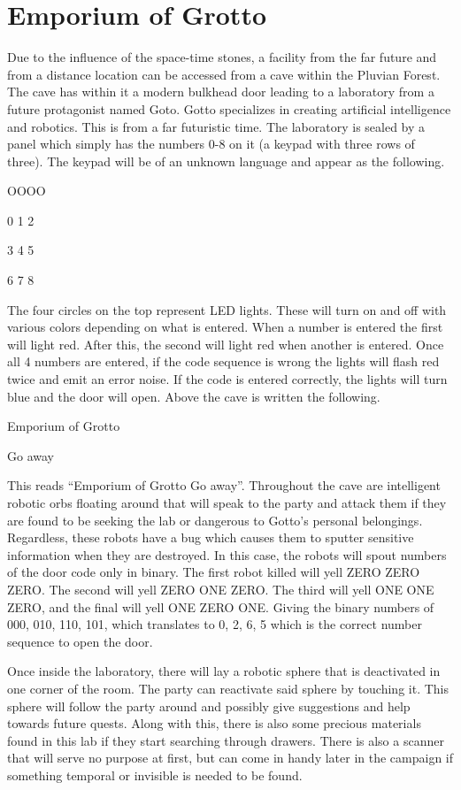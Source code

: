 \section{Emporium of Grotto}

Due to the influence of the space-time stones, a facility from the far future and from a distance location can be accessed from a cave within the Pluvian Forest. The cave has within it a modern bulkhead door leading to a laboratory from a future protagonist named Goto. Gotto specializes in creating artificial intelligence and robotics. This is from a far futuristic time.  The laboratory is sealed by a panel which simply has the numbers 0-8 on it (a keypad with three rows of three). The keypad will be of an unknown language and appear as the following.

\begin{center}
	{\Huge {}
		OOOO
		
		0 1 2
		
		3 4 5
		
		6 7 8
	}
\end{center}

The four circles on the top represent LED lights. These will turn on and off with various colors depending on what is entered. When a number is entered the first will light red. After this, the second will light red when another is entered. Once all 4 numbers are entered, if the code sequence is wrong the lights will flash red twice and emit an error noise. If the code is entered correctly, the lights will turn blue and the door will open. Above the cave is written the following.

\begin{center}
		{\Huge {}
			Emporium of Grotto
			
			Go away
		}
\end{center}

This reads ``Emporium of Grotto Go away''. Throughout the cave are intelligent robotic orbs floating around that will speak to the party and attack them if they are found to be seeking the lab or dangerous to Gotto’s personal belongings. Regardless, these robots have a bug which causes them to sputter sensitive information when they are destroyed. In this case, the robots will spout numbers of the door code only in binary. The first robot killed will yell ZERO ZERO ZERO. The second will yell ZERO ONE ZERO. The third will yell ONE ONE ZERO, and the final will yell ONE ZERO ONE. Giving the binary numbers of 000, 010, 110, 101, which translates to 0, 2, 6, 5 which is the correct number sequence to open the door. 

Once inside the laboratory, there will lay a robotic sphere that is deactivated in one corner of the room. The party can reactivate said sphere by touching it. This sphere will follow the party around and possibly give suggestions and help towards future quests. Along with this, there is also some precious materials found in this lab if they start searching through drawers. There is also a scanner that will serve no purpose at first, but can come in handy later in the campaign if something temporal or invisible is needed to be found.
